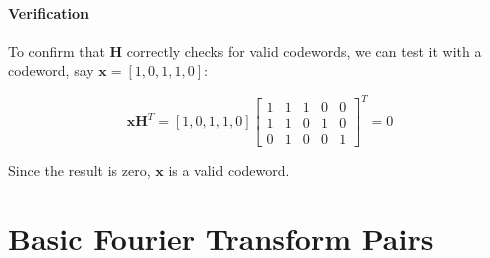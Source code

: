 \documentclass[10pt]{article}
\begin{document}
\paragraph{Verification}
To confirm that \( \mathbf{H} \) correctly checks for valid codewords, we can test it with a codeword, say \( \mathbf{x} = [1, 0, 1, 1, 0] \):

\[
\mathbf{x} \mathbf{H}^T = [1, 0, 1, 1, 0] \begin{bmatrix} 1 & 1 & 1 & 0 & 0 \\ 1 & 1 & 0 & 1 & 0 \\ 0 & 1 & 0 & 0 & 1 \end{bmatrix}^T = 0
\]

Since the result is zero, \( \mathbf{x} \) is a valid codeword.

\newpage
\appendix
\section{Basic Fourier Transform Pairs}
\end{document}
